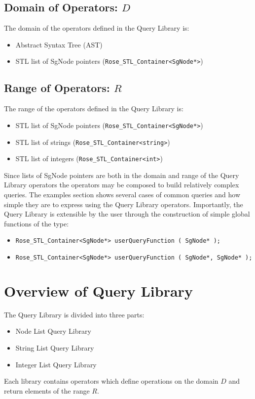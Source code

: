 {\subsection{Domain of Operators: $D$}
    The domain of the operators defined in the Query Library is:
\begin{itemize}
     \item Abstract Syntax Tree (AST)
     \item STL list of SgNode pointers ({\tt Rose\_STL\_Container<SgNode*>})
\end{itemize}

\subsection{Range of Operators: $R$}
    The range of the operators defined in the Query Library is:
\begin{itemize}
     \item STL list of SgNode pointers ({\tt Rose\_STL\_Container<SgNode*>})
     \item STL list of strings ({\tt Rose\_STL\_Container<string>})
     \item STL list of integers ({\tt Rose\_STL\_Container<int>})
\end{itemize}

Since lists of SgNode pointers are both in the domain and range of the Query Library
operators the operators may be composed to build relatively complex queries.  The examples
section shows several cases of common queries and how simple they are to express
using the Query Library operators.  Importantly, the Query Library is extensible
by the user through the construction of simple global functions of the type:
\begin{itemize}
     \item {\tt Rose\_STL\_Container<SgNode*> userQueryFunction ( SgNode* );}
     \item {\tt Rose\_STL\_Container<SgNode*> userQueryFunction ( SgNode*, SgNode* );}
\end{itemize}

\section{Overview of Query Library}
    The Query Library is divided into three parts:
\begin{itemize}
     \item Node List Query Library
     \item String List Query Library
     \item Integer List Query Library
\end{itemize}
Each library contains operators which define operations on the domain $D$ and
return elements of the range $R$.

}
